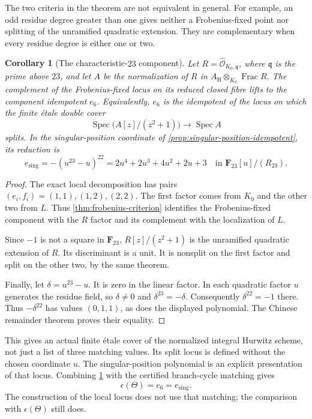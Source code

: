 \documentclass[11pt]{amsart}
\newtheorem{corollary}[corollary]{Corollary}
\theoremstyle{definition}
\theoremstyle{remark}
\newcommand{\FF}{\mathbf F}
\begin{document}
The two criteria in the theorem are not equivalent in general.  For
example, an odd residue degree greater than one gives neither a
Frobenius-fixed point nor splitting of the unramified quadratic extension.
They are complementary when every residue degree is either one or two.

\begin{corollary}[The characteristic-$23$ component]
\label{cor:frobenius-hurwitz}
Let $R=\widehat{\mathcal O}_{K_0,\mathfrak q}$, where
$\mathfrak q$ is the prime above $23$, and let $A$ be the normalization of
$R$ in $A_{\mathrm H}\otimes_{K_0}\operatorname{Frac}R$.
The complement of the Frobenius-fixed locus on its reduced closed fibre
lifts to the component idempotent $e_6$.  Equivalently, $e_6$ is the
idempotent of the locus on which the finite \'etale double cover
\[
 \operatorname{Spec}\bigl(A[z]/(z^2+1)\bigr)
 \longrightarrow\operatorname{Spec}A
\]
splits.  In the singular-position coordinate of
\cref{prop:singular-position-idempotent}, its reduction is
\[
 e_{\mathrm{sing}}=-(u^{23}-u)^{22}
                 =2u^4+2u^3+4u^2+2u+3
 \quad\text{in }\FF_{23}[u]/(R_{23}).
\]
\end{corollary}

\begin{proof}
The exact local decomposition has pairs
$(e_i,f_i)=(1,1),(1,2),(2,2)$.  The first factor comes from $K_0$ and
the other two from $L$.  Thus \cref{thm:frobenius-criterion} identifies
the Frobenius-fixed component with the $R$ factor and its complement
with the localization of $L$.

Since $-1$ is not a square in $\FF_{23}$, $R[z]/(z^2+1)$ is the
unramified quadratic extension of $R$.  Its discriminant is a unit.
It is nonsplit on the first factor and split on the other two, by the
same theorem.

Finally, let $\delta=u^{23}-u$.  It is zero in the linear factor.
In each quadratic factor $u$ generates the residue field, so $\delta\ne0$
and $\delta^{23}=-\delta$.  Consequently $\delta^{22}=-1$ there.
Thus $-\delta^{22}$ has values $(0,1,1)$, as does the displayed polynomial.
The Chinese remainder theorem proves their equality.
\end{proof}

This gives an actual finite \'etale cover of the normalized integral
Hurwitz scheme, not just a list of three matching values.  Its split
locus is defined without the chosen coordinate $u$.  The singular-position
polynomial is an explicit presentation of that locus.  Combining
\cref{cor:frobenius-hurwitz} with the certified branch-cycle matching gives
\[
 \epsilon(\Theta)=e_6=e_{\mathrm{sing}}.
\]
The construction of the local locus does not use that matching; the
comparison with $\epsilon(\Theta)$ still does.
\end{document}
